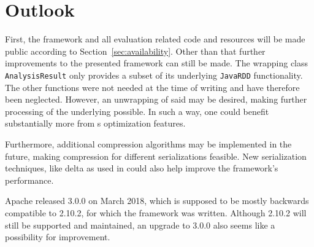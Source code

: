 \section{Outlook}
\label{sec:outlook}
First, the framework and all evaluation related code and resources will be made public according to Section~\ref{sec:availability}. Other than that further improvements to the presented framework can still be made. The wrapping class \lstinline|AnalysisResult| only provides a subset of its underlying \lstinline|JavaRDD| functionality. The other functions were not needed at the time of writing and have therefore been neglected. However, an unwrapping of said \rdd{} may be desired, making further processing of the underlying \cas{} possible. In such a way, one could benefit substantially more from \spark{}s optimization features.

Furthermore, additional compression algorithms may be implemented in the future, making compression for different serializations feasible. New serialization techniques, like delta \cas{} as used in \cite{epstein2012making} could also help improve the framework's performance.

Apache released \uima{} 3.0.0 on March 2018, which is supposed to be mostly backwards compatible to \uima{} 2.10.2, for which the framework was written. Although \uima{} 2.10.2 will still be supported and maintained, an upgrade to \uima{} 3.0.0 also seems like a possibility for improvement.